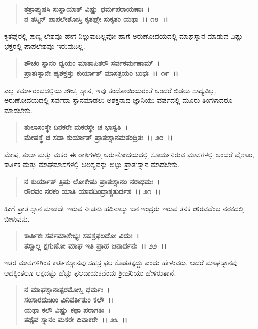 \begin{verse}
\textbf{ತತ್ರಾಪ್ಯುಷಸಿ ಸುಸ್ನಾಯಾತ್ ವಿಷ್ಣು ಧರ್ಮಪರಾಯಣಾಃ~।}\\\textbf{ನ ತಸ್ಮಿನ್ ಪಾಪಲೇಶೋಸ್ತಿ ಕೃತಘ್ನೇ ಸುಕೃತಂ ಯಥಾ~।। ೧೮~।।}
\end{verse}

ಕೃತಘ್ನರಲ್ಲಿ ಪುಣ್ಯ ಲೇಶವೂ ಹೇಗೆ ನಿಲ್ಲುವುದಿಲ್ಲವೋ ಹಾಗೆ ಅರುಣೋದಯದಲ್ಲಿ ಮಾಘಸ್ನಾನ ಮಾಡುವ ವಿಷ್ಣು ಭಕ್ತರಲ್ಲಿ ಪಾಪಲೇಶವೂ ಇರುವುದಿಲ್ಲ.

\begin{verse}
\textbf{ಶೌಚಂ ಸ್ನಾನಂ ದ್ವಯಂ ಮಾತಾಪಿತರೌ ಸರ್ವಕರ್ಮಣಾಮ್~।}\\\textbf{ಪ್ರಾತಃಸ್ನಾನೇ ಹ್ಯಶಕ್ತಸ್ತು ಕುರ್ಯಾತ್ ಮಾಸತ್ರಯಂ ಬುಧಃ~।। ೧೯~।।}
\end{verse}

ಎಲ್ಲ ಕರ್ಮಾರಂಭದಲ್ಲಿಯ ಶೌಚ, ಸ್ನಾನ, ಇವು ತಂದೆತಾಯಿಯರಂತೆ ಅಂದರೆ ಬಿಡಲು ಸಾಧ್ಯವಿಲ್ಲ. ಅರುಣೋದಯದಲ್ಲಿ ಸರ್ವದಾ ಸ್ನಾನಮಾಡಲು ಅಶಕ್ತನಾದ ಜ್ಞಾನಿಯು ವರ್ಷದಲ್ಲಿ ಮೂರು ತಿಂಗಳಾದರೂ ಮಾಡಬೇಕು.

\begin{verse}
\textbf{ತುಲಾಸಂಸ್ಥೇ ದಿನಕರೇ ಮಕರಸ್ಥೇ ಚ ಭಾಸ್ವತಿ~।}\\\textbf{ಮೇಷಸ್ಥೆ ಚ ಸದಾ ಕುರ್ಯಾತ್ ಪ್ರಾತಃಸ್ನಾನಮತಂದ್ರಿತಃ~।। ೨೦~।।}
\end{verse}

ಮೇಷ, ತುಲಾ ಮತ್ತು ಮಕರ ಈ ರಾಶಿಗಳಲ್ಲಿ ಅರುಣೋದಯದಲ್ಲಿ ಸೂರ್ಯನಿರುವ ಮಾಸಗಳಲ್ಲಿ ಅಂದರೆ ವೈಶಾಖ, ಕಾರ್ತಿಕ ಮತ್ತು ಮಾಘಮಾಸಗಳಲ್ಲಿ ಆಲಸ್ಯವನ್ನು ಬಿಟ್ಟು ಪ್ರಾತಃಸ್ನಾನ ಮಾಡಬೇಕು.

\begin{verse}
\textbf{ನ ಕುರ್ಯಾತ್ ತ್ರಿಷು ಲೋಕೇಷು ಪ್ರಾತಃಸ್ನಾನಂ ನರಾಧಮಃ~।}\\\textbf{ರೌರವಂ ನರಕಂ ಯಾತಿ ಯಾವದಿಂದ್ರಾಶ್ಚತುರ್ದಶ~।। ೨೧~।।}
\end{verse}

ಹೀಗೆ ಪ್ರಾತಃಸ್ನಾನ ಮಾಡದೇ ಇರುವ ನೀಚನು ಹದಿನಾಲ್ಕು ಜನ ಇಂದ್ರರು ಇರುವ ತನಕ ರೌರವವೆಂಬ ನರಕದಲ್ಲಿ ಬೀಳುವನು.

\begin{verse}
\textbf{ಕಾರ್ತಿಕಃ ಸರ್ವಮಾಸೇಭ್ಯಃ ಸಹಸ್ರಫಲದೋ ವಿದುಃ~।}\\\textbf{ತಸ್ಮಾಲ್ಲ ಕ್ಷಗುಣೋ ಮಾಘ ಇತಿ ಪ್ರಾಹ ಜನಾರ್ದನಃ~।। ೨೨~।।}
\end{verse}

ಇತರ ಮಾಸಗಳಿಗಿಂತ ಕಾರ್ತಿಕಸ್ನಾನವು ಸಹಸ್ರ ಫಲ ಕೊಡತಕ್ಕದ್ದು ಎಂದು ಹೇಳುವರು. ಆದರೆ ಮಾಘಸ್ನಾನವು ಅದಕ್ಕಿಂತಲೂ ಲಕ್ಷದಷ್ಟು ಹೆಚ್ಚು ಫಲದಾಯಕವೆಂದು ಶ‍್ರೀಹರಿಯು ಹೇಳಿರುತ್ತಾನೆ.

\begin{verse}
\textbf{ನ ಮಾಘಸ್ನಾನಾತ್ಪರಮೋಸ್ತಿ ಧರ್ಮಃ~।}\\\textbf{ಸಂಸಾರದುಃಖಂ ವಿನಿವರ್ತಿತುಂ ಕಲೌ~।।}\\\textbf{ಯಥಾ ಕಲೌ ವಿಷ್ಣು ಕಥಾ ಪರಾಗತಿಃ~।}\\\textbf{ತಥೈವ ಸ್ನಾನಂ ಮಕರೇ ದಿವಾಕರೇ~।। ೨೩~।।}
\end{verse}

